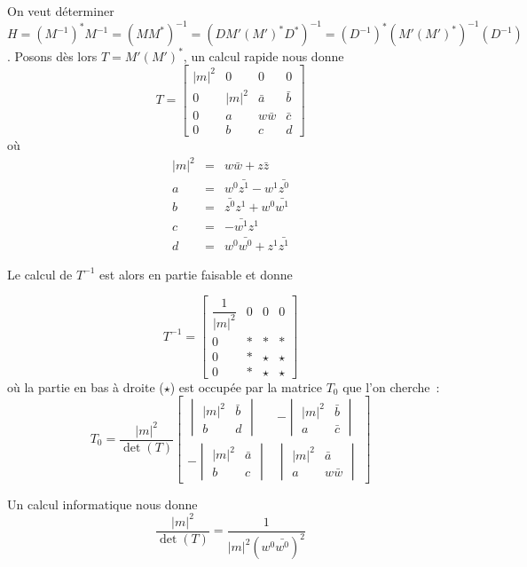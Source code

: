 \documentclass[a4paper,10pt]{article}
\begin{document}
On veut déterminer $H = (M^{-1})^*M^{-1} = (MM^*)^{-1} = (DM'(M')^*D^*)^{-1} = (D^{-1})^*(M'(M')^*)^{-1}(D^{-1})$ . Posons dès lors $T = M'(M')^*$, un calcul rapide nous donne
\[
T = \begin{bmatrix}
|m|^2 &0 & 0 & 0 \\ 
0 & |m|^2 & \bar{a} &\bar{b} \\ 
0 & a & w\bar{w} & \bar{c}  \\ 
0& b & c & d
\end{bmatrix} 
\]
où
\begin{eqnarray*}
|m|^2 & = & w \bar{w} + z \bar{z}\\
a & = & w^0\bar{z^1}-w^1\bar{z^0} \\
b & = & \bar{z^0}z^1 + w^0 \bar{w^1} \\
c & = & -\bar{w^1}z^1 \\
d & = & w^0\bar{w^0} + z^1 \bar{z^1}
\end{eqnarray*}

Le calcul de $T^{-1}$ est alors en partie faisable et donne

\[
T^{-1} = \begin{bmatrix}
\dfrac{1}{|m|^2} &0 & 0 & 0 \\ 
0 & * & * &* \\ 
0 & * & \star & \star  \\ 
0& *& \star & \star
\end{bmatrix} 
\]
où la partie en bas à droite ($\star$) est occupée par la matrice $T_0$ que l'on cherche~:
\[
T_0 = \dfrac{|m|^2}{\det(T)}
\begin{bmatrix}
\begin{vmatrix}
|m|^2 & \bar{b} \\ 
b & d
\end{vmatrix}& 
-\begin{vmatrix}
|m|^2 & \bar{b} \\ 
a & \bar{c}
\end{vmatrix} \\
-\begin{vmatrix}
|m|^2 & \bar{a} \\ 
b & c
\end{vmatrix} & 
\begin{vmatrix}
|m|^2 & \bar{a} \\ 
a & w\bar{w}
\end{vmatrix}
\end{bmatrix} 
\]

Un calcul informatique nous donne
\[
\dfrac{|m|^2}{\det(T)} = \dfrac{1}{|m|^2(w^0\bar{w^0})^2}
\]
\end{document}

